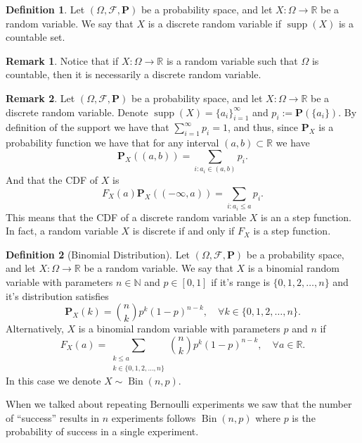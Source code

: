 \documentclass[11pt,a4paper]{article}
\theoremstyle{definition}
\newtheorem{definition}{Definition}[section]
\newtheorem{remark}{Remark}[section]
\theoremstyle{plain}
\DeclareMathOperator{\supp}{supp}
\DeclareMathOperator{\Bin}{Bin}
\newcommand{\N}{\mathbb{N}}
\newcommand{\R}{\mathbb{R}}
\begin{document}
  \begin{definition}
    Let $(\Omega ,\mathcal F, \mathbf P)$ be a probability space,
    and let $X \colon \Omega \to \R$ be a random variable.
    We say that $X$ is a discrete random variable if $\supp(X)$ is a 
    countable set.
  \end{definition}
  \begin{remark}
    Notice that if $X \colon \Omega \to \R$ is a random variable such
    that $\Omega$ is countable, then it is necessarily a discrete random
    variable.
  \end{remark}
  \begin{remark}
    Let $(\Omega ,\mathcal F, \mathbf P)$ be a probability space,
    and let $X \colon \Omega \to \R$ be a discrete random variable.
    Denote $\supp(X) = \{a_i\}_{i=1}^{\infty}$ and $p_i := \mathbf P(\{a_i\})$.
    By definition of the support we have that $\sum_{i=1}^{\infty} p_i = 1$,
    and thus, since $\mathbf P_X$ is a probability function we have that
    for any interval $(a,b) \subset \R$ we have
    \[
      \mathbf P_X \left((a,b)\right) = \sum_{i \colon a_i \in (a,b)} p_i.
    \]
    And that the CDF of $X$ is
    \[
      F_X(a)
      \mathbf P_X \left((-\infty,a)\right) = \sum_{i \colon a_i \le a} p_i.
    \]
    This means that the CDF of a discrete random variable $X$ is an a step
    function. In fact, a random variable $X$ is discrete if and only if
    $F_X$ is a step function.
  \end{remark}

  \begin{definition}[Binomial Distribution]
    Let $(\Omega ,\mathcal F, \mathbf P)$ be a probability space,
    and let $X \colon \Omega \to \R$ be a random variable.
    We say that $X$ is a binomial random variable with parameters
    $n \in \N$ and $p \in [0,1]$ if it's range is $\{0,1,2,\dots,n\}$ and
    it's distribution satisfies
    \[
      \mathbf P_X(k) = \binom{n}{k} p^k (1-p)^{n-k}, \quad 
      \forall k \in \{0,1,2,\dots,n\}.
    \]
    Alternatively, $X$ is a binomial random variable with parameters
    $p$ and $n$ if
    \[
      F_X(a) = \sum_{\substack{k \le a \\ k \in \{0,1,2,\dots,n\}}}
      \binom{n}{k} p^k (1-p)^{n-k}, \quad \forall a \in \R.
    \]
    In this case we denote $X \sim \Bin(n,p)$.
  \end{definition}
  When we talked about repeating Bernoulli experiments we saw that the number
  of ``success'' results in $n$ experiments follows $\Bin(n,p)$ where
  $p$ is the probability of success in a single experiment.
  
\end{document}
